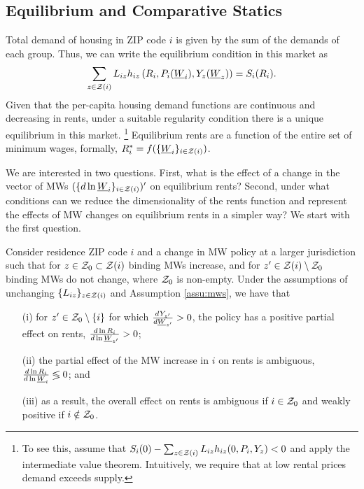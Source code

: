 \subsection{Equilibrium and Comparative Statics}

Total demand of housing in ZIP code $i$ is given by the sum of the demands of 
each group.
Thus, we can write the equilibrium condition in this market as
\begin{equation}\label{eq:equilibrium}
	\sum_{z\in\mathcal{Z}(i)} L_{iz} h_{iz} \left(R_i, P_i(\underline{W}_i), Y_z(\underline{W}_z)\right) = S_i(R_i) .
\end{equation}
Given that the per-capita housing demand functions are continuous and 
decreasing in rents,
under a suitable regularity condition there is a unique equilibrium in this 
market.%
\footnote{To see this, assume that 
$S_i(0) - \sum_{z\in\mathcal{Z}(i)} L_{iz} h_{iz} (0, P_i, Y_z) < 0$
and apply the intermediate value theorem.
Intuitively, we require that at low rental prices demand exceeds supply.}
Equilibrium rents are a function of the entire set of minimum wages, formally, 
$R^*_i = f(\{\underline{W}_i\}_{i\in\mathcal{Z}(i)})$.

We are interested in two questions.
First, what is the effect of a change in the vector of MWs 
$(\{d \ln \underline{W}_i\}_{i\in\mathcal{Z}(i)})'$ on equilibrium rents?
Second, under what conditions can we reduce the dimensionality of the rents 
function and represent the effects of MW changes on equilibrium rents in a 
simpler way?
We start with the first question.

\begin{prop}\label{prop:comparative_statics}
    Consider residence ZIP code $i$ and a change in MW policy at a larger
    jurisdiction such that for $z\in\mathcal{Z}_0 \subset \mathcal{Z}(i)$ binding MWs increase, 
    and for $z'\in\mathcal{Z}(i)\setminus \mathcal{Z}_0$ binding MWs do not change,
    where $\mathcal{Z}_0$ is non-empty.
    Under the assumptions of unchanging $\{L_{iz}\}_{z\in\mathcal{Z}(i)}$ 
    and Assumption \ref{assu:mws},
    we have that
    \begin{enumerate}
        \item[(i)]
        for $z'\in\mathcal{Z}_0\setminus\{i\}$ for which $\frac{d Y_{z'}}{d \underline{W}_{z'}}>0$, 
        the policy has a positive partial effect on rents, 
        $\frac{d\ln R_i}{d\ln\underline{W}_{z'}} > 0$;
        \item[(ii)]
        the partial effect of the MW increase in $i$ on rents is ambiguous, 
        $\frac{d\ln R_i}{d\ln\underline{W}_i} \lessgtr 0$; and
        \item[(iii)]
        as a result, the overall effect on rents is ambiguous if $i\in\mathcal{Z}_0$ 
        and weakly positive if $i\notin\mathcal{Z}_0$.
    \end{enumerate}
\end{prop}

